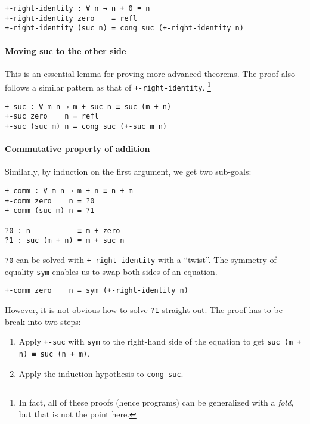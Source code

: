 \documentclass[../thesis.tex]{subfiles}
\begin{document}
\begin{lstlisting}
+-right-identity : ∀ n → n + 0 ≡ n
+-right-identity zero    = refl
+-right-identity (suc n) = cong suc (+-right-identity n)
\end{lstlisting}

\paragraph{Moving suc to the other side}

This is an essential lemma for proving more advanced theorems.
The proof also follows a similar pattern as that of {\lstinline|+-right-identity|}.
\footnote{In fact, all of these proofs (hence programs) can be generalized with
a \textit{fold}, but that is not the point here.}

\begin{lstlisting}
+-suc : ∀ m n → m + suc n ≡ suc (m + n)
+-suc zero    n = refl
+-suc (suc m) n = cong suc (+-suc m n)
\end{lstlisting}

\paragraph{Commutative property of addition}

Similarly, by induction on the first argument, we get two sub-goals:

\begin{lstlisting}
+-comm : ∀ m n → m + n ≡ n + m
+-comm zero    n = ?0
+-comm (suc m) n = ?1

?0 : n           ≡ m + zero
?1 : suc (m + n) ≡ m + suc n
\end{lstlisting}

{\lstinline|?0|} can be solved with {\lstinline|+-right-identity|} with a ``twist''.
The symmetry of equality {\lstinline|sym|} enables us to swap both sides of an equation.

\begin{lstlisting}
+-comm zero    n = sym (+-right-identity n)
\end{lstlisting}

However, it is not obvious how to solve {\lstinline|?1|} straight out.
The proof has to be break into two steps:

\begin{enumerate}
    \item Apply {\lstinline|+-suc|} with {\lstinline|sym|} to the right-hand side
    of the equation to get {\lstinline|suc (m + n) ≡ suc (n + m)|}.
    \item Apply the induction hypothesis to {\lstinline|cong suc|}.
\end{enumerate}
\end{document}
